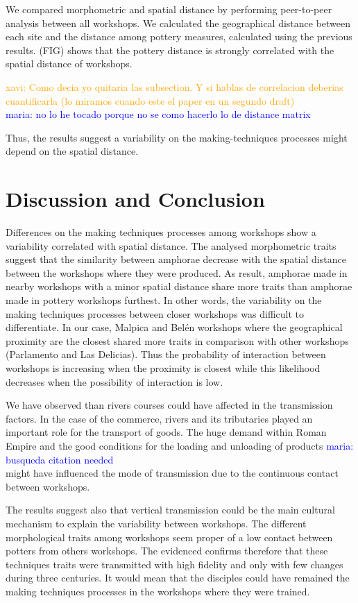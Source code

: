 \documentclass[review]{elsarticle}
\newcommand{\memo}[2]{\textcolor{#1}{#2}}
\newcommand{\xavi}[1]{\memo{orange}{xavi: #1\\}}
\newcommand{\maria}[1]{\memo{blue}{maria: #1\\}}
\begin{document}
We compared morphometric and spatial distance by performing peer-to-peer analysis between all workshops. We calculated the geographical distance between each site and the distance among pottery measures, calculated using the previous results. (FIG) shows that the pottery distance is strongly correlated with the spatial distance of workshops.


\xavi{Como decia yo quitaria las subsection. Y si hablas de correlacion deberias cuantificarla (lo miramos cuando este el paper en un segundo draft)}
\maria{no lo he tocado porque no se como hacerlo lo de distance matrix}



Thus, the results suggest a variability on the making-techniques processes might depend on the spatial distance.  

\section{Discussion and Conclusion}


Differences on the making techniques processes among workshops show a variability correlated with spatial distance. The analysed morphometric traits suggest that the similarity between amphorae decrease with the spatial distance between the workshops where they were produced. As result, amphorae made in nearby workshops with a minor spatial distance share more traits than amphorae made in pottery workshops furthest. In other words, the variability on the making techniques processes between closer workshops was difficult to differentiate. In our case, Malpica and Bel\'en workshops where the geographical proximity are the closest shared more traits in comparison with other workshops (Parlamento and Las Delicias). Thus the probability of interaction between workshops is increasing when the proximity is closest while this likelihood decreases when the possibility of interaction is low. 

We have observed than rivers courses could have affected in the transmission factors. In the case of the commerce, rivers and its tributaries played an important role for the transport of goods. The huge demand within Roman Empire and the good conditions for the loading and unloading of products \maria {busqueda citation needed} might have influenced the mode of transmission due to the continuous contact between workshops. 

The results suggest also that vertical transmission could be the main cultural mechanism to explain the variability between workshops. The different morphological traits among workshops seem proper of a low contact between potters from others workshops. The evidenced confirms therefore that these techniques traits were transmitted with high fidelity and only with few changes during three centuries. It would mean that the disciples could have remained the making techniques processes in the workshops where they were trained.  
\end{document}
